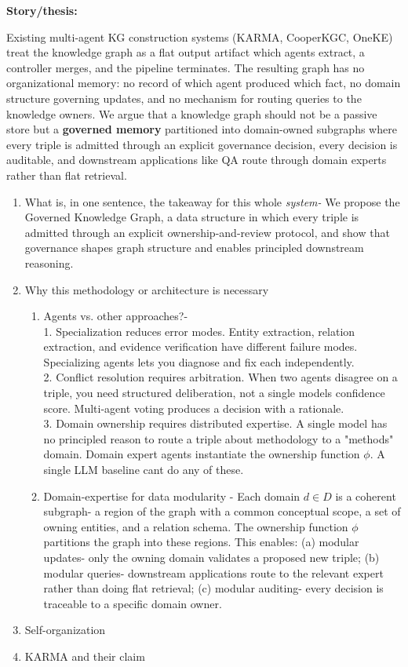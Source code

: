 \textbf{Story/thesis:}

Existing multi-agent KG construction systems (KARMA, CooperKGC, OneKE)
treat the knowledge graph as a flat output artifact which agents
extract, a controller merges, and the pipeline terminates. The resulting
graph has no organizational memory: no record of which agent produced
which fact, no domain structure governing updates, and no mechanism for
routing queries to the knowledge owners. We argue that a knowledge graph
should not be a passive store but a \textbf{governed memory} partitioned
into domain-owned subgraphs where every triple is admitted through an
explicit governance decision, every decision is auditable, and
downstream applications like QA route through domain experts rather than
flat retrieval.

\begin{enumerate}
\def\labelenumi{\arabic{enumi}.}
\item
  What is, in one sentence, the takeaway for this whole \emph{system-}
  We propose the Governed Knowledge Graph, a data structure in which
  every triple is admitted through an explicit ownership-and-review
  protocol, and show that governance shapes graph structure and enables
  principled downstream reasoning.
\item
  Why this methodology or architecture is necessary

  \begin{enumerate}
  \def\labelenumii{\alph{enumii}.}
  \item
    Agents vs. other approaches?-\\
    1. Specialization reduces error modes. Entity extraction, relation
    extraction, and evidence verification have different failure modes.
    Specializing agents lets you diagnose and fix each independently.\\
    2. Conflict resolution requires arbitration. When two agents
    disagree on a triple, you need structured deliberation, not a single
    model\textquotesingle s confidence score. Multi-agent voting
    produces a decision with a rationale.\\
    3. Domain ownership requires distributed expertise. A single model
    has no principled reason to route a triple about methodology to a
    "methods" domain. Domain expert agents instantiate the ownership
    function $\phi$. A single LLM baseline can\textquotesingle t do any of
    these.
  \item
    Domain-expertise for data modularity - Each domain $d \in D$ is a
    coherent subgraph- a region of the graph with a common conceptual
    scope, a set of owning entities, and a relation schema. The
    ownership function $\phi$ partitions the graph into these regions. This
    enables: (a) modular updates- only the owning domain validates a
    proposed new triple; (b) modular queries- downstream applications
    route to the relevant expert rather than doing flat retrieval; (c)
    modular auditing- every decision is traceable to a specific domain
    owner.
  \end{enumerate}
\item
  Self-organization
\item
  KARMA and their claim


\end{enumerate}

